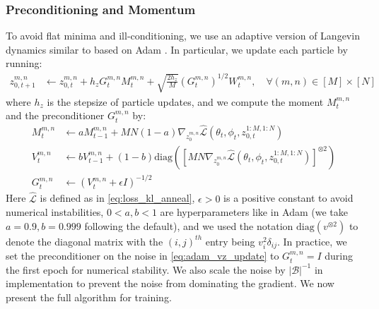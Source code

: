 \subsubsection{Preconditioning and Momentum}
To avoid flat minima and ill-conditioning, we use an adaptive version of Langevin dynamics similar to \citet{Li2016,kim2020stochasticgradientlangevindynamics} based on Adam \citep{kingma2017adammethodstochasticoptimization}. In particular, we update each particle by running:
\begin{align}\label{eq:adam_vz_update}
z_{0,t+1}^{m,n} &\gets z_{0,t}^{m,n} + h_z G_{t}^{m,n} M_{t}^{m,n} +\sqrt{\frac{2h_z}{M}} (G_{t}^{m,n})^{1/2}W_{t}^{m,n}, \quad \forall (m,n) \in [M] \times [N]
\end{align}
where $h_z$ is the stepsize of particle updates, and we compute the moment $M_{t}^{m,n}$  and the preconditioner $G_{t}^{m,n}$ by:
\begin{subequations}\label{eq:vz_momentum}
\begin{align}
	M_{t}^{m,n} &\gets a M_{t-1}^{m,n} + {MN}(1-a) \nabla_{z_{0}^{m,n}}
\hat{\mathcal{L}}(\theta_t,\phi_t,z^{1:M,1:N}_{0,t}) \\
	V_{t}^{m,n} &\gets b V_{t-1}^{m,n} + (1-b) \text{diag}\left( \left[{MN}\nabla_{z_{0}^{m,n}  }
\hat{\mathcal{L}}(\theta_t,\phi_t,z^{1:M,1:N}_{0,t})\right]^{\otimes 2}\right)  \\
			G_{t}^{m,n} &\gets (V_{t}^{m,n} + \epsilon I)^{-1/2}
\end{align}
\end{subequations}
Here $\hat{\mathcal{L}}$ is defined as in \eqref{eq:loss_kl_anneal}, $\epsilon >0$ is a positive constant to avoid numerical instabilities, $0<a,b<1$ are hyperparameters like in Adam \citep{kingma2017adammethodstochasticoptimization} (we take $a=0.9, b=0.999$ following the default), and we used the notation $\text{diag}(v^{\otimes 2})$ to denote the diagonal matrix with the $(i,j)^{th}$ entry being $v_i^2\delta_{ij}$. In practice, we set the preconditioner on the noise in \eqref{eq:adam_vz_update} to $G_{t}^{m,n}=I$ during the first epoch for numerical stability. We also scale the noise by $|\mathcal{B}|^{-1}$ in implementation to prevent the noise from dominating the gradient. We now present the full algorithm for training.

